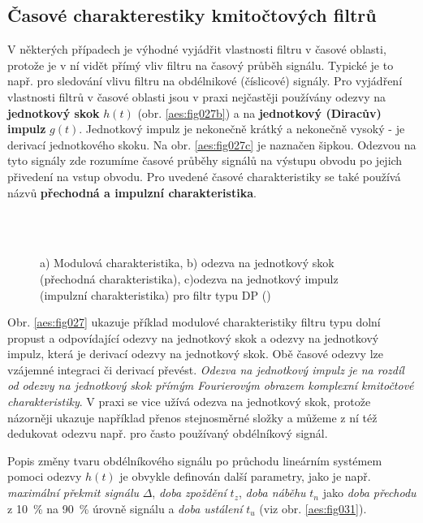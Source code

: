     \subsection{Časové charakterestiky kmitočtových filtrů}  
      V některých případech je výhodné vyjádřit vlastnosti filtru v časové oblasti, protože je v ní
      vidět přímý vliv filtru na časový průběh signálu. Typické je to např. pro sledování vlivu
      filtru na obdélnikové (číslicové) signály. Pro vyjádření vlastnosti filtrů v časové oblasti
      jsou v praxi nejčastěji používány odezvy na \textbf{jednotkový skok} \(h(t)\) (obr.
      \ref{aes:fig027b}) a na \textbf{jednotkový (Diracův) impulz} \(g(t)\). Jednotkový impulz
      je nekonečně krátký a nekonečně vysoký - je derivací jednotkového skoku. Na obr.
      \ref{aes:fig027c} je naznačen šipkou. Odezvou na tyto signály zde rozumíme časové průběhy
      signálů na výstupu obvodu po jejich přivedení na vstup obvodu. Pro uvedené časové
      charakteristiky se také používá názvů \textbf{přechodná a impulzní charakteristika}. 

      \begin{figure}[ht!]
        \centering
          \\
          \\
        \caption{a) Modulová charakteristika, b) odezva na jednotkový skok (přechodná
                charakteristika), c)odezva na jednotkový impulz (impulzní charakteristika) pro filtr
                typu DP (\cite[s.~30]{HajekSedlacek2002})}
                \label{aes:fig030}
      \end{figure}
      
      Obr. \ref{aes:fig027} ukazuje příklad modulové charakteristiky filtru typu dolní propust a
      odpovídající odezvy na jednotkový skok a odezvy na jednotkový impulz, která je derivací odezvy
      na jednotkový skok. Obě časové odezvy lze vzájemné integraci či derivací převést. \emph{Odezva
      na jednotkový impulz je na rozdíl od odezvy na jednotkový skok přímým Fourierovým obrazem
      komplexní kmitočtové charakteristiky}. V praxi se vice užívá odezva na jednotkový skok,
      protože názorněji ukazuje například přenos stejnosměrné složky a můžeme z ní též dedukovat
      odezvu např. pro často používaný obdélníkový signál. 

      Popis změny tvaru obdélníkového signálu po průchodu lineárním systémem pomoci odezvy \(h(t)\)
      je obvykle definován další parametry, jako je např. \emph{maximální překmit signálu}
      \(\Delta\), \emph{doba zpoždění} \(t_z\), \emph{doba náběhu} \(t_n\) jako \emph{doba přechodu}
      z \qty{10}{\percent} na \qty{90}{\percent} úrovně signálu a \emph{doba ustálení} \(t_u\) (viz
      obr. \ref{aes:fig031}). 

